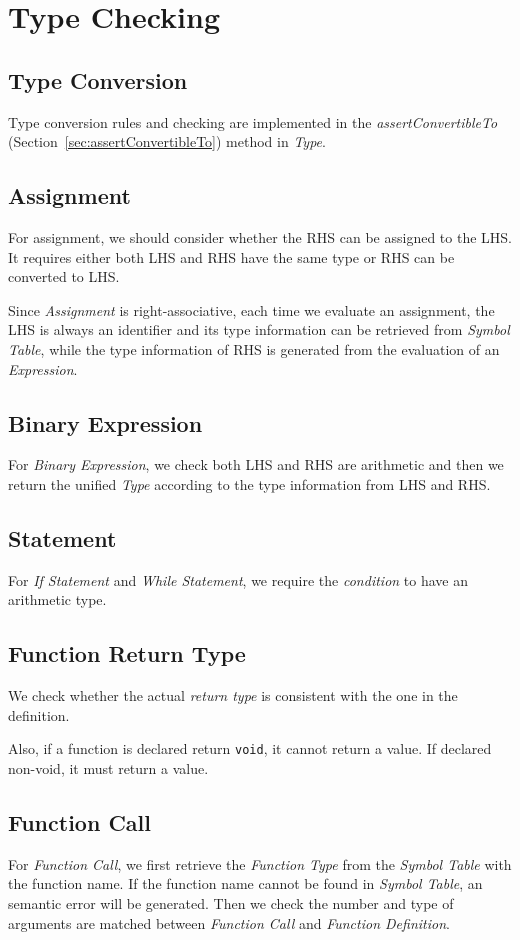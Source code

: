 \documentclass[a4paper,11pt]{article}
\begin{document}
\section{Type Checking}
\subsection{Type Conversion}
Type conversion rules and checking are implemented in the \emph{assertConvertibleTo} (Section~\ref{sec:assertConvertibleTo}) method in \emph{Type}.

\subsection{Assignment}
For assignment, we should consider whether the RHS can be assigned to the LHS. It requires either both LHS and RHS have the same type or RHS can be converted to LHS.

Since \emph{Assignment} is right-associative, each time we evaluate an assignment, the LHS is always an identifier and its type information can be retrieved from \emph{Symbol Table}, while the type information of RHS is generated from the evaluation of an \emph{Expression}.

\subsection{Binary Expression}
For \emph{Binary Expression}, we check both LHS and RHS are arithmetic and then we return the unified \emph{Type} according to the type information from LHS and RHS.

\subsection{Statement}
For \emph{If Statement} and \emph{While Statement}, we require the \emph{condition} to have an arithmetic type.

\subsection{Function Return Type}
We check whether the actual \emph{return type} is consistent with the one in the definition.

Also, if a function is declared return \texttt{void}, it cannot return a value. If declared non-void, it must return a value.

\subsection{Function Call}
For \emph{Function Call}, we first retrieve the \emph{Function Type} from the \emph{Symbol Table} with the function name. If the function name cannot be found in \emph{Symbol Table}, an semantic error will be generated. Then we check the number and type of arguments are matched between \emph{Function Call} and \emph{Function Definition}.
\end{document}
